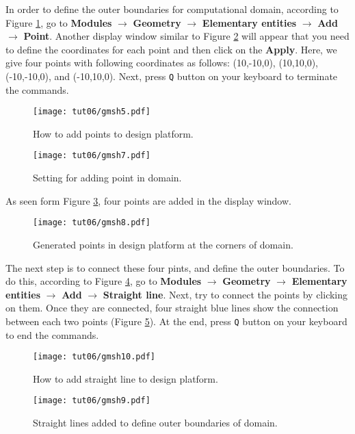 In order to define the outer boundaries for computational domain, according to Figure \ref{fig6:gmsh5}, go to \textbf{Modules} $\rightarrow$ \textbf{Geometry} $\rightarrow$ \textbf{Elementary entities} $\rightarrow$ \textbf{Add} $\rightarrow$ \textbf{Point}. Another display window similar to Figure \ref{fig6:gmsh7} will appear that you need to define the coordinates for each point and then click on the \textbf{Apply}. Here, we give four points with following coordinates as follows: (10,-10,0), (10,10,0), (-10,-10,0), and (-10,10,0). Next, press \texttt{Q} button on your keyboard to terminate the commands.
\begin{figure}[htbp]
    \centering
    \texttt{[image: tut06/gmsh5.pdf]}
    \caption{How to add points to design platform.}
    \label{fig6:gmsh5}
\end{figure}
\begin{figure}[htbp]
    \centering
    \texttt{[image: tut06/gmsh7.pdf]}
    \caption{Setting for adding point in domain.}
    \label{fig6:gmsh7}
\end{figure}
As seen form Figure \ref{fig6:gmsh8}, four points are added in the display window.
\begin{figure}[htbp]
    \centering
    \texttt{[image: tut06/gmsh8.pdf]}
    \caption{Generated points in design platform at the corners of domain.}
    \label{fig6:gmsh8}
\end{figure}
The next step is to connect these four pints, and define the outer boundaries. To do this, according to Figure \ref{fig6:gmsh10}, go to \textbf{Modules} $\rightarrow$ \textbf{Geometry} $\rightarrow$ \textbf{Elementary entities} $\rightarrow$ \textbf{Add} $\rightarrow$ \textbf{Straight line}. Next, try to connect the points by clicking on them. Once they are connected, four straight blue lines show the connection between each two points (Figure \ref{fig6:gmsh9}). At the end, press \texttt{Q} button on your keyboard to end the commands.
\begin{figure}[htbp]
    \centering
    \texttt{[image: tut06/gmsh10.pdf]}
    \caption{How to add straight line to design platform.}
    \label{fig6:gmsh10}
\end{figure}
\begin{figure}[htbp]
    \centering
    \texttt{[image: tut06/gmsh9.pdf]}
    \caption{Straight lines added to define outer boundaries of domain.}
    \label{fig6:gmsh9}
\end{figure}
